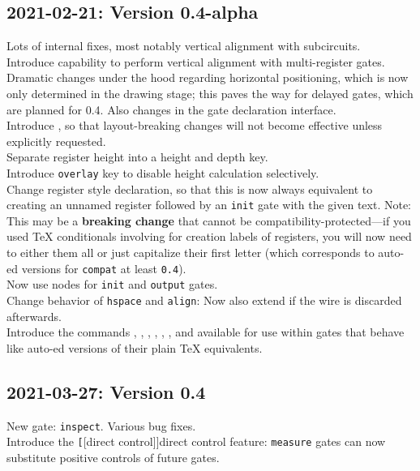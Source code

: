 \documentclass{scrartcl}
\makeatletter
\def\ttlink{\link\texttt}
\def\texlink{\link\tex}
\def\textlink{\link\@firstofone}
\makeatother
\begin{document}
      \subsection*{2021-02-21: Version 0.4-alpha}
         Lots of internal fixes, most notably vertical alignment with subcircuits. \\
         Introduce capability to perform vertical alignment with multi\hyp register gates. \\
         Dramatic changes under the hood regarding horizontal positioning, which is now only determined in the drawing stage; this paves the way for delayed gates, which are planned for 0.4.
         Also changes in the gate declaration interface. \\
         Introduce \textlink[compat]{compatibility layer}, so that layout\hyp breaking changes will not become effective unless explicitly requested. \\
         Separate register height into a height and depth key. \\
         Introduce \ttlink{overlay} key to disable height calculation selectively. \\
         Change register style declaration, so that this is now always equivalent to creating an unnamed register followed by an \ttlink{init} gate with the given text.
         Note: This may be a \textbf{breaking change} that cannot be compatibility\hyp protected---if you used \TeX{} conditionals involving \texlink{\idx} for creation labels of registers, you will now need to either \texlink{\protect} them all or just capitalize their first letter (which corresponds to auto\hyp\texlink\protect ed versions for \ttlink{compat} at least \texttt{0.4}). \\
         Now use nodes for \ttlink{init} and \ttlink{output} gates. \\
         Change behavior of \ttlink{hspace} and \ttlink{align}: Now also extend if the wire is discarded afterwards. \\
         Introduce the commands \texlink\Ifnum, \texlink\Ifcase, \texlink\Or, \texlink\Else, \texlink\Fi, \texlink\Unless, and \texlink{\The} available for use within gates that behave like auto\hyp\texlink\protect ed versions of their plain \TeX{} equivalents.

      \subsection*{2021-03-27: Version 0.4}
         New gate: \ttlink{inspect}. Various bug fixes. \\
         Introduce the \ttlink[{[direct control]}]{direct control} feature: \ttlink{measure} gates can now substitute positive controls of future gates.
\end{document}
